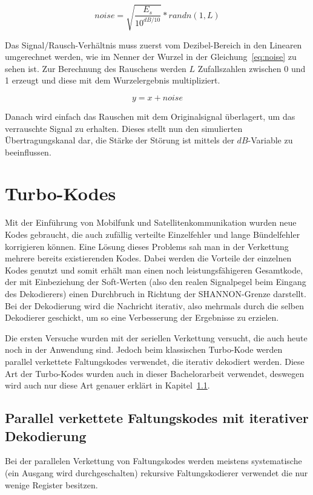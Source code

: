 \begin{equation}
noise = \sqrt{\frac{E_s}{10^{dB/10}}} * randn(1,L)
\label{eq:noise}
\end{equation}

Das Signal/Rausch-Verhältnis muss zuerst vom Dezibel-Bereich in den Linearen umgerechnet werden, wie im Nenner der Wurzel in der Gleichung~\ref{eq:noise} zu sehen ist.
Zur Berechnung des Rauschens werden $L$ Zufallszahlen zwischen 0 und 1 erzeugt und diese mit dem Wurzelergebnis multipliziert. 

\begin{equation}
y = x + noise
\label{eq:noisySignal}
\end{equation}

Danach wird einfach das Rauschen mit dem Originalsignal überlagert, um das verrauschte Signal zu erhalten. Dieses stellt nun den simulierten Übertragungskanal dar, die Stärke der Störung ist mittels der $dB$-Variable zu beeinflussen. \cite{AWGN}

\section{Turbo-Kodes}
\label{sec:turboCodes}
Mit der Einführung von Mobilfunk und Satellitenkommunikation wurden neue Kodes gebraucht, die auch zufällig verteilte Einzelfehler und lange Bündelfehler korrigieren können. Eine Lösung dieses Problems sah man in der Verkettung mehrere bereits existierenden Kodes. Dabei werden die Vorteile der einzelnen Kodes genutzt und somit erhält man einen noch leistungsfähigeren Gesamtkode, der mit Einbeziehung der Soft-Werten (also den realen Signalpegel beim Eingang des Dekodierers) einen Durchbruch in Richtung der SHANNON-Grenze darstellt. Bei der Dekodierung wird die Nachricht iterativ, also mehrmals durch die selben Dekodierer geschickt, um so eine Verbesserung der Ergebnisse zu erzielen. \cite[242 f.]{schoenfeld2012informations}

Die ersten Versuche wurden mit der seriellen Verkettung versucht, die auch heute noch in der Anwendung sind. Jedoch beim klassischen Turbo-Kode werden parallel verkettete Faltungskodes verwendet, die iterativ dekodiert werden. Diese Art der Turbo-Kodes wurden auch in dieser Bachelorarbeit verwendet, deswegen wird auch nur diese Art genauer erklärt in Kapitel~\ref{sec:parallelConvCodes}.

\subsection{Parallel verkettete Faltungskodes mit iterativer Dekodierung} 
\label{sec:parallelConvCodes}
Bei der parallelen Verkettung von Faltungskodes werden meistens systematische (ein Ausgang wird durchgeschalten) rekursive Faltungskodierer verwendet die nur wenige Register besitzen.

